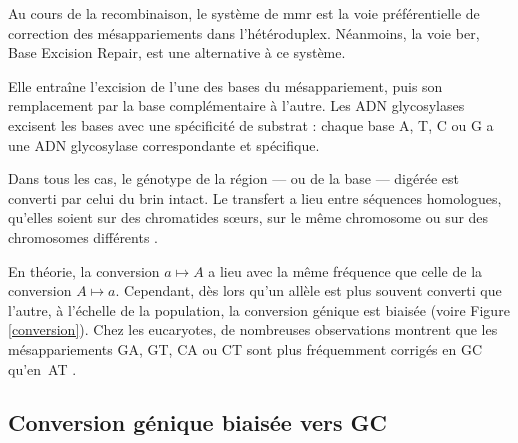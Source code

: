 \documentclass[11pt, oneside]{scrartcl}
\begin{document}
Au cours de la recombinaison, le système de \ac{mmr} est la voie préférentielle
de correction des mésappariements dans l'hétéroduplex. Néanmoins, la voie
\ac{ber}, Base Excision Repair, est une alternative à ce système.

Elle entraîne l'excision de l'une des bases du mésappariement, puis son
remplacement par la base complémentaire à l'autre. Les ADN glycosylases excisent
les bases avec une spécificité de substrat : chaque base A, T, C ou G a une ADN
glycosylase correspondante et spécifique.

Dans tous les cas, le génotype de la région --- ou de la base --- digérée est
converti par celui du brin intact. Le transfert a lieu entre séquences
homologues, qu'elles soient sur des chromatides sœurs, sur le même chromosome ou
sur des chromosomes différents \cite{chen_gene_2007}.

\begin{transition}
  En théorie, la conversion $a \mapsto A$ a lieu avec la même fréquence que
  celle de la conversion $A \mapsto a$. Cependant, dès lors qu'un allèle est
  plus souvent converti que l'autre, à l'échelle de la population, la conversion
  génique est biaisée (voire Figure \ref{conversion}). Chez les eucaryotes, de
  nombreuses observations montrent que les mésappariements GA, GT, CA ou CT sont
  plus fréquemment corrigés en GC qu'en AT \cite{duret_biased_2009}.
\end{transition}

\subsection{Conversion génique biaisée vers GC}
\label{sec:orgheadline7}
\end{document}
